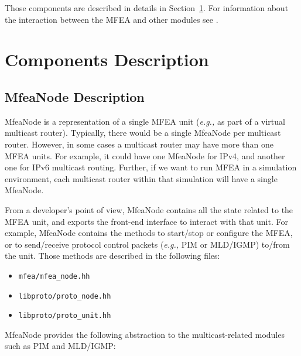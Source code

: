 \documentclass[11pt]{article}
\newcommand{\eg}{\emph{e.g.,}\xspace}
\begin{document}
Those components are described in details in
Section~\ref{sec:components_description}.
For information about the interaction between the MFEA and other modules see
\cite{xorp:multicast_arch}.

\section{Components Description}
\label{sec:components_description}


\subsection{MfeaNode Description}

MfeaNode is a representation of a single MFEA unit (\eg as part of a
virtual multicast router).
Typically, there would be a single MfeaNode per multicast router.
However, in some cases a multicast router may have more than one
MFEA units. For example, it could have one MfeaNode for IPv4, and
another one for IPv6 multicast routing. Further, if we want to
run MFEA in a simulation environment, each multicast router within that
simulation will have a single MfeaNode.

From a developer's point of view, MfeaNode contains all the state
related to the MFEA unit, and exports the front-end interface
to interact with that unit.
For example, MfeaNode contains the methods to
start/stop or configure the MFEA, or to send/receive protocol control
packets (\eg PIM or MLD/IGMP) to/from the unit. Those methods are
described in the following files:

\begin{itemize}
  \item \verb=mfea/mfea_node.hh=
  \item \verb=libproto/proto_node.hh=
  \item \verb=libproto/proto_unit.hh=
\end{itemize}

MfeaNode provides the following abstraction to the multicast-related
modules such as PIM and MLD/IGMP:
\end{document}
